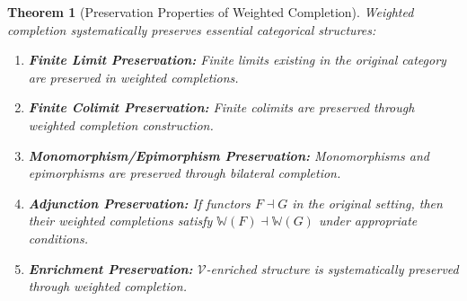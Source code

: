 \documentclass[11pt]{article}
\theoremstyle{plain}
\newtheorem{theorem}{Theorem}[section]
\theoremstyle{definition}
\theoremstyle{remark}
\newcommand{\V}{\mathcal{V}}
\begin{document}
\begin{theorem}[Preservation Properties of Weighted Completion]\label{thm:preservation-properties}
Weighted completion systematically preserves essential categorical structures:

\begin{enumerate}
\item \textbf{Finite Limit Preservation:} Finite limits existing in the original category are preserved in weighted completions.

\item \textbf{Finite Colimit Preservation:} Finite colimits are preserved through weighted completion construction.

\item \textbf{Monomorphism/Epimorphism Preservation:} Monomorphisms and epimorphisms are preserved through bilateral completion.

\item \textbf{Adjunction Preservation:} If functors $F \dashv G$ in the original setting, then their weighted completions satisfy $\mathbb{W}(F) \dashv \mathbb{W}(G)$ under appropriate conditions.

\item \textbf{Enrichment Preservation:} $\V$-enriched structure is systematically preserved through weighted completion.
\end{enumerate}
\end{theorem}
\end{document}
